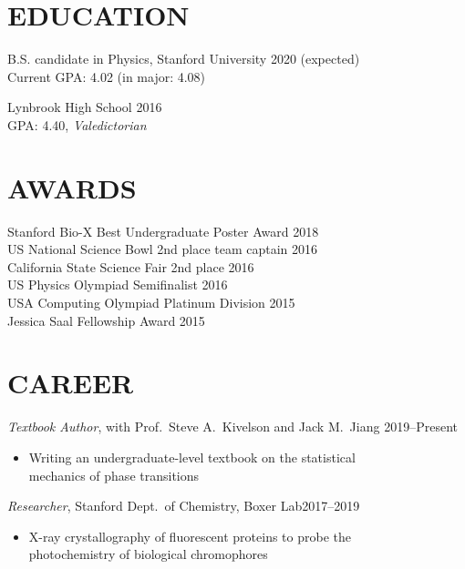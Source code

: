 \documentclass[margin, 10pt]{res}
\newenvironment{myitemize}
{ \vspace{-1.5\topsep} \begin{itemize} }
{ \end{itemize} \vspace{-1.0\topsep}}
\begin{document}
\address{jeffjar@stanford.edu --- \url{https://stanford.edu/~jeffjar}}

\begin{resume}

\section{EDUCATION}

B.S. candidate in Physics, Stanford University \hfill 2020 (expected) \\
Current GPA: 4.02 (in major: 4.08)
 
Lynbrook High School \hfill 2016 \\
GPA: 4.40, \textit{Valedictorian}

\section{AWARDS}
 
Stanford Bio-X Best Undergraduate Poster Award \hfill 2018 \\
US National Science Bowl 2nd place team captain \hfill 2016 \\
California State Science Fair 2nd place \hfill 2016 \\
US Physics Olympiad Semifinalist \hfill 2016 \\
USA Computing Olympiad Platinum Division \hfill 2015 \\
Jessica Saal Fellowship Award \hfill 2015

\section{CAREER}

\textit{Textbook Author}, with Prof.\ Steve A.\ Kivelson and Jack M.\ Jiang  \hfill 2019--Present \\
\begin{myitemize}
    \item Writing an undergraduate-level textbook on the statistical\\
        mechanics of phase transitions
\end{myitemize}

\textit{Researcher}, Stanford Dept.\ of Chemistry, Boxer Lab\hfill 2017--2019 \\
\begin{myitemize}
    \item X-ray crystallography of fluorescent proteins to probe the\\ photochemistry of biological chromophores
\end{myitemize}


\end{resume}
\end{document}
